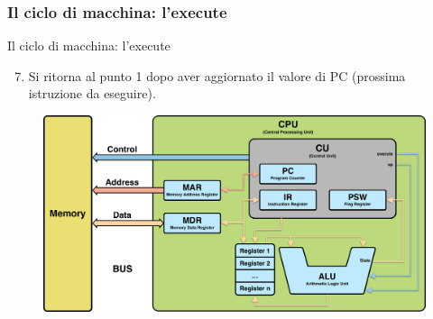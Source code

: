 \begin{frame}
	\frametitle{Il ciclo di macchina: l'{\color{CpuYellow}\textbf{execute}}}
	
	\begin{block}{Il ciclo di macchina: l'execute}	
		\begin{enumerate}
			\setcounter{enumi}{6}
			\item Si ritorna al punto 1 dopo aver aggiornato il valore di PC (prossima istruzione da eseguire).
		\end{enumerate}
	
	\end{block}
	
	\begin{figure}[!htbp] 
		\centering
		\includegraphics[width=0.7\linewidth]{images/4_cpu/architecture_cpu_complex.pdf}
		\label{fig:cpu_complex}
	\end{figure}
	
\end{frame}

